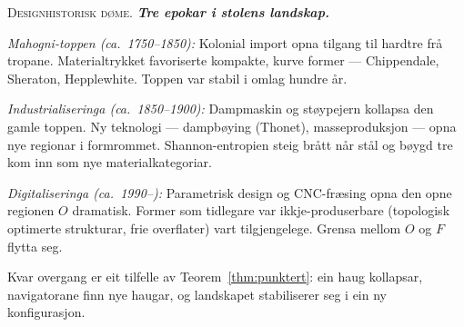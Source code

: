 \documentclass[10pt]{book}
\theoremstyle{definition}
\theoremstyle{plain}
\theoremstyle{remark}
\newenvironment{designhistorie}%
  {\medskip\noindent\textsc{Designhistorisk d\o me.}\itshape\enspace}%
  {\medskip}
\begin{document}
\begin{designhistorie}
\textbf{Tre epokar i stolens landskap.}

\textit{Mahogni-toppen (ca.\ 1750--1850):} Kolonial import opna tilgang til hardtre fr\aa{} tropane. Materialtrykket favoriserte kompakte, kurve former --- Chippendale, Sheraton, Hepplewhite. Toppen var stabil i omlag hundre \aa r.

\textit{Industrialiseringa (ca.\ 1850--1900):} Dampmaskin og st\o ypejern kollapsa den gamle toppen. Ny teknologi --- dampb\o ying (Thonet), masseproduksjon --- opna nye regionar i formrommet. Shannon-entropien steig br\aa tt n\aa r st\aa l og b\o ygd tre kom inn som nye materialkategoriar.

\textit{Digitaliseringa (ca.\ 1990--):} Parametrisk design og CNC-fr\ae sing opna den opne regionen $O$ dramatisk. Former som tidlegare var ikkje-produserbare (topologisk optimerte strukturar, frie overflater) vart tilgjengelege. Grensa mellom $O$ og $F$ flytta seg.

Kvar overgang er eit tilfelle av Teorem~\ref{thm:punktert}: ein haug kollapsar, navigatorane finn nye haugar, og landskapet stabiliserer seg i ein ny konfigurasjon.
\end{designhistorie}
\end{document}
